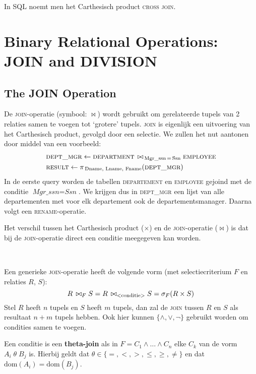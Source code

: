 In SQL noemt men het Carthesisch product \textsc{cross join}.



\section{Binary Relational Operations: JOIN and DIVISION}
\subsection{The JOIN Operation}
De \textsc{join}-operatie (symbool: $\bowtie$) wordt gebruikt om gerelateerde tupels van 2 relaties samen te voegen tot `grotere' tupels. \textsc{join} is eigenlijk een uitvoering van het Carthesisch product, gevolgd door een selectie. We zullen het nut aantonen door middel van een voorbeeld:
\vspace{-2mm}
\begin{align*}
&\textsc{dept\_mgr} \leftarrow \textsc{department} \,\bowtie_{\,\text{Mgr\_ssn} \,=\, \text{Ssn}} \textsc{employee}\\
&\textsc{result} \leftarrow \pi_{\,\text{Dname, Lname, Fname}}(\textsc{dept\_mgr})
\end{align*}
In de eerste query worden de tabellen \textsc{departement} en \textsc{employee} gejoind met de conditie $\textit{Mgr\_ssn}=\textit{Ssn}$. We krijgen dus in \textsc{dept\_mgr} een lijst van alle departementen met voor elk departement ook de departementsmanager. Daarna volgt een \textsc{rename}-operatie.

Het verschil tussen het Carthesisch product ($\times$) en de \textsc{join}-operatie ($\bowtie$) is dat bij de \textsc{join}-operatie direct een conditie meegegeven kan worden.

~

\noindent Een generieke \textsc{join}-operatie heeft de volgende vorm (met selectiecriterium $F$ en relaties $R$, $S$):
\vspace{-2mm}
\[ R \,\bowtie_F S = R \,\bowtie_{\text{{\textless}conditie{\textgreater}}} S = \sigma_F(R \times S) \]
Stel $R$ heeft $n$ tupels en $S$ heeft $m$ tupels, dan zal de \textsc{join} tussen $R$ en $S$ als resultaat $n+m$ tupels hebben. Ook hier kunnen $\{ \wedge, \vee, \neg \}$ gebruikt worden om condities samen te voegen.

Een conditie is een \textbf{theta-join} als in $F = C_1 \wedge \dots \wedge C_n$ elke $C_k$ van de vorm $A_i \; \theta \; B_j$ is. Hierbij geldt dat $\theta \in \{=, <, >, \leqslant, \geqslant, \neq \}$ en dat $\text{dom}(A_i) = \text{dom}(B_j)$.

